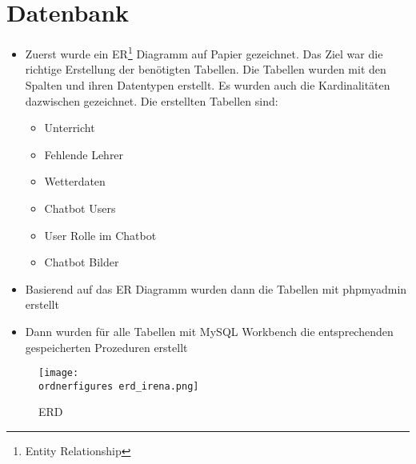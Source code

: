 \section{Datenbank}
\begin{itemize}
	\item Zuerst wurde ein ER\footnote{Entity Relationship} Diagramm auf Papier gezeichnet. Das Ziel war die richtige Erstellung der benötigten Tabellen. Die Tabellen wurden mit den Spalten und ihren Datentypen erstellt. Es wurden auch die Kardinalitäten dazwischen gezeichnet. Die erstellten Tabellen sind:
	
	\begin{itemize}
		\item Unterricht
	\end{itemize}
    \begin{itemize}
    	\item Fehlende Lehrer
    \end{itemize}
    \begin{itemize}
    	\item Wetterdaten
    \end{itemize}
    \begin{itemize}
	\item Chatbot Users
    \end{itemize}	
	\begin{itemize}
		\item User Rolle im Chatbot
	\end{itemize}
	\begin{itemize}
		\item Chatbot Bilder
	\end{itemize}

\end{itemize}
\begin{itemize}
	\item Basierend auf das ER Diagramm wurden dann die Tabellen mit phpmyadmin erstellt
\end{itemize}
\begin{itemize}
	\item Dann wurden für alle Tabellen mit MySQL Workbench die entsprechenden gespeicherten Prozeduren erstellt 
\end{itemize}	
\begin{figure}[ht]	
	\texttt{[image: \\ordnerfigures erd\_irena.png]}
	\caption{ERD}
	\label{fig:erd}
\end{figure}
